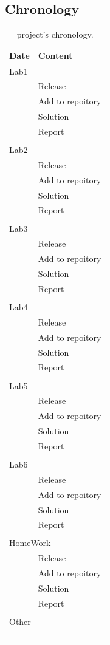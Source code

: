 \documentclass[a4paper,12pt,titlepage]{article} %
\begin{document}
\subsection{Chronology}
\begin{longtable}{|c|p{13cm}|}
	\hline
	Date & Content\\
	\hline
	\multicolumn{2}{|l|}{Lab1} \\
	\hline
	&  Release\\
	\hline
	&  Add to repoitory\\
	\hline
	&  Solution\\
	\hline
	&  Report\\
	\hline
	&  \\
	\hline
	\multicolumn{2}{|l|}{Lab2} \\
	\hline
	&  Release\\
	\hline
	&  Add to repoitory\\
	\hline
	&  Solution\\
	\hline
	&  Report\\
	\hline
	&  \\
	\hline
	\multicolumn{2}{|l|}{Lab3} \\
	\hline
	&  Release\\
	\hline
	&  Add to repoitory\\
	\hline
	&  Solution\\
	\hline
	&  Report\\
	\hline
	&  \\
	\hline
	\multicolumn{2}{|l|}{Lab4} \\
	\hline
	&  Release\\
	\hline
	&  Add to repoitory\\
	\hline
	&  Solution\\
	\hline
	&  Report\\
	\hline
	&  \\
	\hline
	\multicolumn{2}{|l|}{Lab5} \\
	\hline
	&  Release\\
	\hline
	&  Add to repoitory\\
	\hline
	&  Solution\\
	\hline
	&  Report\\
	\hline
	&  \\
	\hline
	\multicolumn{2}{|l|}{Lab6} \\
	\hline
	&  Release\\
	\hline
	&  Add to repoitory\\
	\hline
	&  Solution\\
	\hline
	&  Report\\
	\hline
	&  \\
	\hline
	\multicolumn{2}{|l|}{HomeWork} \\
	\hline
	&  Release\\
	\hline
	&  Add to repoitory\\
	\hline
	&  Solution\\
	\hline
	&  Report\\
	\hline
	&  \\
	\hline
	\multicolumn{2}{|l|}{Other} \\
	\hline
	& \\
	\hline
	& \\
	\hline
	\caption{project's chronology.}
\end{longtable}
\end{document}
